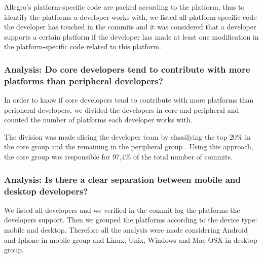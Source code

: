 \documentclass[10pt, conference]{IEEEtran}
\begin{document}
Allegro's  platform-specific code are packed according to the platform, thus to identify the platforms a developer works with, we listed all platform-specific code the developer has touched in the commits and it was considered that a developer supports a certain platform if the developer has made at least one modification in the platform-specific code related to this platform. 






\subsubsection{Analysis: Do core developers tend to contribute with more platforms than peripheral developers?}
\label{met_analysis1}

In order to know if core developers tend to contribute with more platforms than peripheral developers, we divided the developers in core and peripheral and counted the number of platforms each developer works with. 

The division was made slicing the developer team by classifying the top 20\% in the core group and the remaining in the peripheral group \cite{Robles2009}. Using this approach, the core group was responsible for 97,4\% of the total number of commits.

 




\subsubsection{Analysis: Is there a clear separation between mobile and desktop developers?}
\label{met_analysis2}



We listed all developers and we verified in the commit log the platforms the developers support. Then we grouped the platforms according to the device type: mobile and desktop. Therefore all the analysis were made considering Android and Iphone in mobile group and Linux, Unix, Windows and Mac OSX in desktop group.  
\end{document}

